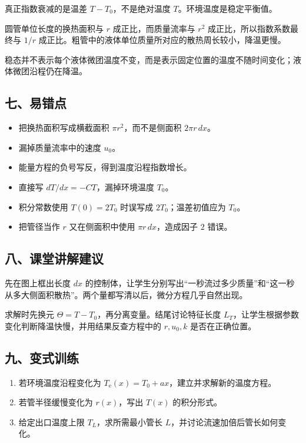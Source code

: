 \documentclass[12pt,a4paper,UTF8]{ctexart}
\newcommand{\tightlist}{\setlength{\itemsep}{0pt}\setlength{\parskip}{0pt}}
\begin{document}
真正指数衰减的是温差 \(T-T_0\)，不是绝对温度
\(T\)。环境温度是稳定平衡值。

圆管单位长度的换热面积与 \(r\) 成正比，而质量流率与 \(r^2\)
成正比，所以指数系数最终与 \(1/r\)
成正比。粗管中的液体单位质量所对应的散热周长较小，降温更慢。

稳态并不表示每个液体微团温度不变，而是表示固定位置的温度不随时间变化；液体微团沿程仍在降温。

\subsection{七、易错点}\label{ux4e03ux6613ux9519ux70b9-6}

\begin{itemize}
\tightlist
\item
  把换热面积写成横截面积 \(\pi r^2\)，而不是侧面积 \(2\pi r\,dx\)。
\item
  漏掉质量流率中的速度 \(u_0\)。
\item
  能量方程的负号写反，得到温度沿程指数增长。
\item
  直接写 \(dT/dx=-CT\)，漏掉环境温度 \(T_0\)。
\item
  积分常数使用 \(T(0)=2T_0\) 时误写成 \(2T_0\)；温差初值应为 \(T_0\)。
\item
  把管径当作 \(r\) 又在侧面积中使用 \(\pi r\,dx\)，造成因子 \(2\) 错误。
\end{itemize}

\subsection{八、课堂讲解建议}\label{ux516bux8bfeux5802ux8bb2ux89e3ux5efaux8bae-6}

先在图上框出长度 \(dx\)
的控制体，让学生分别写出``一秒流过多少质量''和``这一秒从多大侧面积散热''。两个量都写清以后，微分方程几乎自然出现。

求解时先换元 \(\Theta=T-T_0\)，再分离变量。结尾讨论特征长度
\(L_T\)，让学生根据参数变化判断降温快慢，并用结果反查方程中的
\(r,u_0,k\) 是否在正确位置。

\subsection{九、变式训练}\label{ux4e5dux53d8ux5f0fux8badux7ec3-6}

\begin{enumerate}
\def\labelenumi{\arabic{enumi}.}
\tightlist
\item
  若环境温度沿程变化为
  \(T_{\mathrm e}(x)=T_0+ax\)，建立并求解新的温度方程。
\item
  若管半径缓慢变化为 \(r(x)\)，写出 \(T(x)\) 的积分形式。
\item
  给定出口温度上限 \(T_L\)，求所需最小管长
  \(L\)，并讨论流速加倍后管长如何变化。
\end{enumerate}
\end{document}
